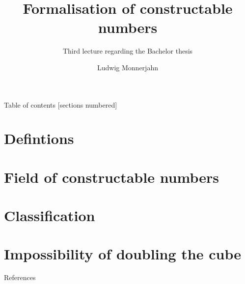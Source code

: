 \documentclass[10pt]{beamer}
\title{Formalisation of constructable numbers}
\subtitle{Third lecture regarding the Bachelor thesis}
\date{}
\author{Ludwig Monnerjahn}
\begin{document}
\maketitle

\begin{frame}{Table of contents}
  [sections numbered]
  \tableofcontents%
\end{frame}

\section{Defintions}


\section{Field of constructable numbers}



\section{Classification}

\section{Impossibility of doubling the cube}

\begin{frame}[allowframebreaks]{References}
    
    
  \end{frame}
\nocite{*}
\end{document}
